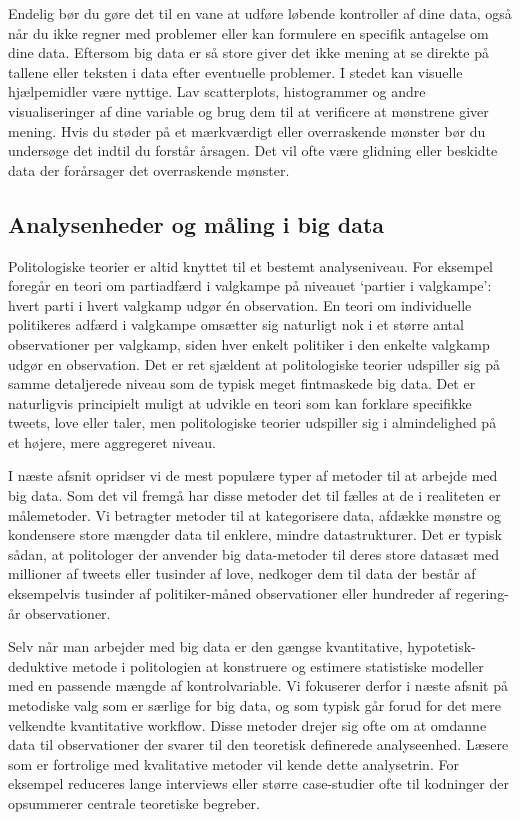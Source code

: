 \documentclass[12pt,]{article}
\begin{document}
Endelig bør du gøre det til en vane at udføre løbende kontroller af dine
data, også når du ikke regner med problemer eller kan formulere en
specifik antagelse om dine data. Eftersom big data er så store giver det
ikke mening at se direkte på tallene eller teksten i data efter
eventuelle problemer. I stedet kan visuelle hjælpemidler være nyttige.
Lav scatterplots, histogrammer og andre visualiseringer af dine variable
og brug dem til at verificere at mønstrene giver mening. Hvis du støder
på et mærkværdigt eller overraskende mønster bør du undersøge det indtil
du forstår årsagen. Det vil ofte være glidning eller beskidte data der
forårsager det overraskende mønster.

\hypertarget{analysenheder-og-muxe5ling-i-big-data}{%
\subsection{Analysenheder og måling i big
data}\label{analysenheder-og-muxe5ling-i-big-data}}

Politologiske teorier er altid knyttet til et bestemt analyseniveau. For
eksempel foregår en teori om partiadfærd i valgkampe på niveauet
`partier i valgkampe': hvert parti i hvert valgkamp udgør én
observation. En teori om individuelle politikeres adfærd i valgkampe
omsætter sig naturligt nok i et større antal observationer per valgkamp,
siden hver enkelt politiker i den enkelte valgkamp udgør en observation.
Det er ret sjældent at politologiske teorier udspiller sig på samme
detaljerede niveau som de typisk meget fintmaskede big data. Det er
naturligvis principielt muligt at udvikle en teori som kan forklare
specifikke tweets, love eller taler, men politologiske teorier udspiller
sig i almindelighed på et højere, mere aggregeret niveau.

I næste afsnit opridser vi de mest populære typer af metoder til at
arbejde med big data. Som det vil fremgå har disse metoder det til
fælles at de i realiteten er målemetoder. Vi betragter metoder til at
kategorisere data, afdække mønstre og kondensere store mængder data til
enklere, mindre datastrukturer. Det er typisk sådan, at politologer der
anvender big data-metoder til deres store datasæt med millioner af
tweets eller tusinder af love, nedkoger dem til data der består af
eksempelvis tusinder af politiker-måned observationer eller hundreder af
regering-år observationer.

Selv når man arbejder med big data er den gængse kvantitative,
hypotetisk-deduktive metode i politologien at konstruere og estimere
statistiske modeller med en passende mængde af kontrolvariable. Vi
fokuserer derfor i næste afsnit på metodiske valg som er særlige for big
data, og som typisk går forud for det mere velkendte kvantitative
workflow. Disse metoder drejer sig ofte om at omdanne data til
observationer der svarer til den teoretisk definerede analyseenhed.
Læsere som er fortrolige med kvalitative metoder vil kende dette
analysetrin. For eksempel reduceres lange interviews eller større
case-studier ofte til kodninger der opsummerer centrale teoretiske
begreber.
\end{document}
